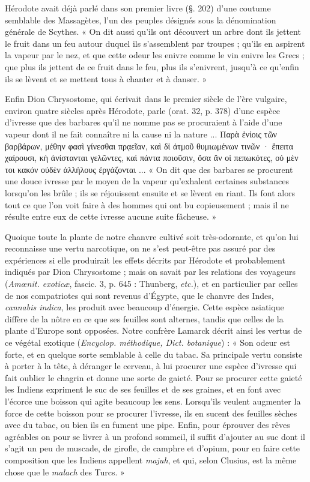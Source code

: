 \documentclass[a4paper, 11pt, oneside, polutonikogreek]{article}
\begin{document}
Hérodote avait déjà parlé dans son premier livre (§. 202) d'une coutume semblable des Massagètes, l'un des peuples désignés sous la dénomination générale de Scythes. « On dit aussi qu'ils ont découvert un arbre dont ils jettent le fruit dans un feu autour duquel ils s'assemblent par troupes ; qu'ils en aspirent la vapeur par le nez, et que cette odeur les enivre comme le vin enivre les Grecs ; que plus ils jettent de ce fruit dans le feu, plus ils s'enivrent, jusqu'à ce qu'enfin ils se lèvent et se mettent tous à chanter et à danser. »

Enfin Dion Chrysostome, qui écrivait dans le premier siècle de l'ère vulgaire, environ quatre siècles après Hérodote, parle (orat. 32, p. 378) d'une espèce d'ivresse que des barbares qu'il ne nomme pas se procuraient à l'aide d'une vapeur dont il ne fait connaître ni la cause ni la nature ... Παρὰ ἐνίοις τῶν βαρβάρων, μέθην φασὶ γίνεσθαι πρᾳεῖαν, καὶ δἰ ἀτμοῦ θυμιωμένων τινῶν · ἕπειτα χαίρουσι, κὴ ἀνίστανται γελῶντες, καὶ πάντα ποιοῦσιν, ὅσα ἂν οἱ πεπωκότες, οὐ μὲν τοι κακόν οὐδὲν ἀλλήλους ἐργάζονται ... « On dit que des barbares se procurent une douce ivresse par le moyen de la vapeur qu'exhalent certaines substances lorsqu'on les brûle ; ils se réjouissent ensuite et se lèvent en riant. Ils font alors tout ce que l'on voit faire à des hommes qui ont bu copieusement ; mais il ne résulte entre eux de cette ivresse aucune suite fâcheuse. »

Quoique toute la plante de notre chanvre cultivé soit très-odorante, et qu'on lui reconnaisse une vertu narcotique, on ne s'est peut-être pas assuré par des expériences si elle produirait les effets décrits par Hérodote et probablement indiqués par Dion Chrysostome ; mais on savait par les relations des voyageurs (\emph{Amœnit. exoticæ}, fascic. 3, p. 645 : Thunberg, \emph{etc.}), et en particulier par celles de nos compatriotes qui sont revenus d'Égypte, que le chanvre des Indes, \emph{cannabis indica}, les produit avec beaucoup d'énergie. Cette espèce asiatique diffère de la nôtre en ce que ses feuilles sont alternes, tandis que celles de la plante d'Europe sont opposées. Notre confrère Lamarck décrit ainsi les vertus de ce végétal exotique (\emph{Encyclop. méthodique, Dict. botanique}) : « Son odeur est forte, et en quelque sorte semblable à celle du tabac. Sa principale vertu consiste à porter à la tête, à déranger le cerveau, à lui procurer une espèce d'ivresse qui fait oublier le chagrin et donne une sorte de gaieté. Pour se procurer cette gaieté les Indiens expriment le suc de ses feuilles et de ses graines, et en font avec l'écorce une boisson qui agite beaucoup les sens. Lorsqu'ils veulent augmenter la force de cette boisson pour se procurer l'ivresse, ils en sucent des feuilles sèches avec du tabac, ou bien ils en fument une pipe. Enfin, pour éprouver des rêves agréables on pour se livrer à un profond sommeil, il suffit d'ajouter au suc dont il s'agit un peu de muscade, de girofle, de camphre et d'opium, pour en faire cette composition que les Indiens appellent \emph{majuh}, et qui, selon Clusius, est la même chose que le \emph{malach} des Turcs. »
\end{document}
